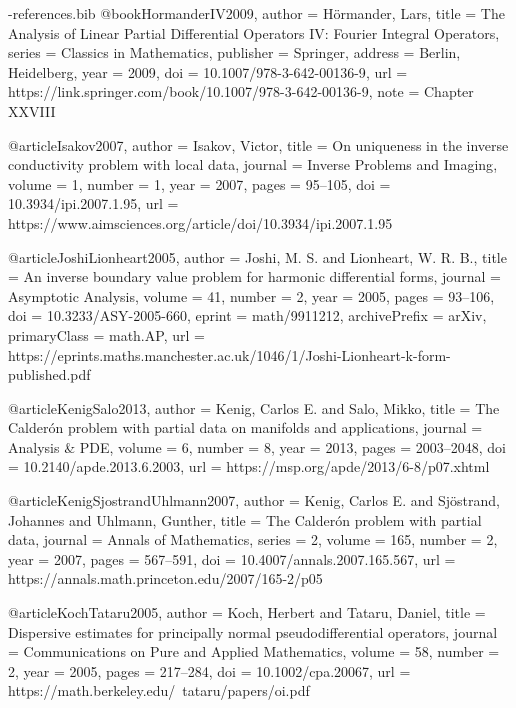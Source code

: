 \documentclass[11pt,a4paper]{article}
\theoremstyle{definition}
\theoremstyle{remark}
\numberwithin{equation}{section}
\begin{document}
\begin{filecontents*}[overwrite]{\jobname-references.bib}
@book{HormanderIV2009,
  author = {H{\"o}rmander, Lars},
  title = {The Analysis of Linear Partial Differential Operators {IV}: Fourier Integral Operators},
  series = {Classics in Mathematics},
  publisher = {Springer},
  address = {Berlin, Heidelberg},
  year = {2009},
  doi = {10.1007/978-3-642-00136-9},
  url = {https://link.springer.com/book/10.1007/978-3-642-00136-9},
  note = {Chapter XXVIII}
}

@article{Isakov2007,
  author = {Isakov, Victor},
  title = {On uniqueness in the inverse conductivity problem with local data},
  journal = {Inverse Problems and Imaging},
  volume = {1},
  number = {1},
  year = {2007},
  pages = {95--105},
  doi = {10.3934/ipi.2007.1.95},
  url = {https://www.aimsciences.org/article/doi/10.3934/ipi.2007.1.95}
}

@article{JoshiLionheart2005,
  author = {Joshi, M. S. and Lionheart, W. R. B.},
  title = {An inverse boundary value problem for harmonic differential forms},
  journal = {Asymptotic Analysis},
  volume = {41},
  number = {2},
  year = {2005},
  pages = {93--106},
  doi = {10.3233/ASY-2005-660},
  eprint = {math/9911212},
  archivePrefix = {arXiv},
  primaryClass = {math.AP},
  url = {https://eprints.maths.manchester.ac.uk/1046/1/Joshi-Lionheart-k-form-published.pdf}
}

@article{KenigSalo2013,
  author = {Kenig, Carlos E. and Salo, Mikko},
  title = {The {Calder{\'o}n} problem with partial data on manifolds and applications},
  journal = {Analysis \& PDE},
  volume = {6},
  number = {8},
  year = {2013},
  pages = {2003--2048},
  doi = {10.2140/apde.2013.6.2003},
  url = {https://msp.org/apde/2013/6-8/p07.xhtml}
}

@article{KenigSjostrandUhlmann2007,
  author = {Kenig, Carlos E. and Sj{\"o}strand, Johannes and Uhlmann, Gunther},
  title = {The {Calder{\'o}n} problem with partial data},
  journal = {Annals of Mathematics},
  series = {2},
  volume = {165},
  number = {2},
  year = {2007},
  pages = {567--591},
  doi = {10.4007/annals.2007.165.567},
  url = {https://annals.math.princeton.edu/2007/165-2/p05}
}

@article{KochTataru2005,
  author = {Koch, Herbert and Tataru, Daniel},
  title = {Dispersive estimates for principally normal pseudodifferential operators},
  journal = {Communications on Pure and Applied Mathematics},
  volume = {58},
  number = {2},
  year = {2005},
  pages = {217--284},
  doi = {10.1002/cpa.20067},
  url = {https://math.berkeley.edu/~tataru/papers/oi.pdf}
}


\end{filecontents*}
\end{document}
